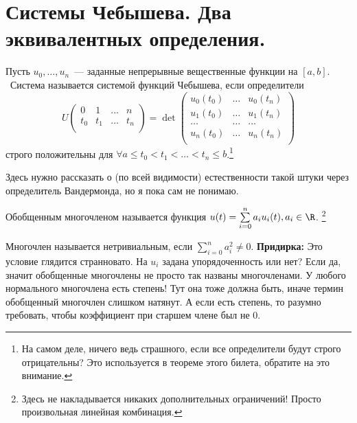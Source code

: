  \section{Системы Чебышева. Два эквивалентных определения.}

\begin{dfn}[Конструктивное]
    \label{chebSystem1}
    Пусть $u_0, …, u_n$ — заданные непрерывные вещественные функции на $[a,b]$.  Система называется системой функций Чебышева, если 
    определители
    $$U\left(
    \begin{array}{cccc}
        0 & 1 & … & n \\
        t_0 & t_1 & … & t_n\\
    \end{array}  \right) = \det \left(
    \begin{array}{ccc}
        u_0(t_0) & … & u_0(t_n) \\
        u_1(t_0) & … & u_1(t_n) \\
        … & … & … \\
        u_n(t_0) & … & u_n(t_n) \\
    \end{array}
    \right)
    $$
    строго положительны для $\forall a \leq t_0 < t_1 < … < t_n \leq b$.\footnote{На самом деле, ничего ведь страшного, если
    все определители будут строго отрицательны? Это используется в теореме этого билета, обратите на это внимание.}
\end{dfn}
{\color{blue} Здесь нужно рассказать о (по всей видимости) естественности такой штуки через определитель Вандермонда, но я пока сам не понимаю.}
\begin{dfn}
    Обобщенным многочленом называется функция $u(t) = \sum \limits_{i=0}^n a_iu_i(t), a_i \in \R$.
    \footnote{Здесь не накладывается никаких дополнительных ограничений! Просто произвольная линейная комбинация.}
\end{dfn}

\begin{dfn}
    Многочлен называется нетривиальным, если $\sum \limits_{i=0}^n a_i^2 \neq 0$.
    {\color{blue} \textbf{Придирка:} Это условие глядится странновато. На $u_i$ задана упорядоченность или нет?
        Если да, значит обобщенные многочлены не просто так названы многочленами.
        У любого нормального многочлена есть степень! Тут она тоже должна быть, иначе термин обобщенный многочлен слишком натянут.
    А если есть степень, то разумно требовать, чтобы коэффициент при старшем члене был не 0.}
\end{dfn}

